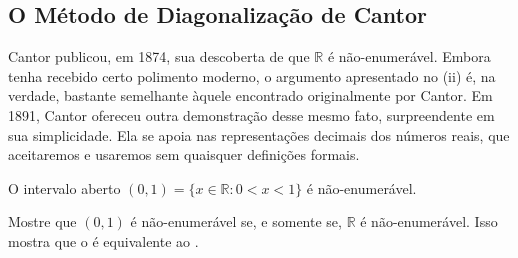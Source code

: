 \subsection{O Método de Diagonalização de Cantor}\label{subsec:metodo-diagonalizacao}

Cantor publicou, em 1874, sua descoberta de que $\mathbb{R}$ é não-enumerável. Embora tenha recebido certo polimento moderno, o argumento apresentado no  (ii) é, na verdade, bastante semelhante àquele encontrado originalmente por Cantor. Em 1891, Cantor ofereceu outra demonstração desse mesmo fato, surpreendente em sua simplicidade. Ela se apoia nas representações decimais dos números reais, que aceitaremos e usaremos sem quaisquer definições formais.

 
\begin{theorem}\label{thm:01-nao-enumeravel}
O intervalo aberto $(0, 1) = \{ x \in \mathbb{R} : 0 < x < 1 \}$ é não-enumerável.
\end{theorem}

\begin{exercise}\label{ex:01-iff-R-nao-enumeravel}
Mostre que $(0, 1)$ é não-enumerável se, e somente se, $\mathbb{R}$ é não-enumerável. Isso mostra que o  é equivalente ao .
\end{exercise}


